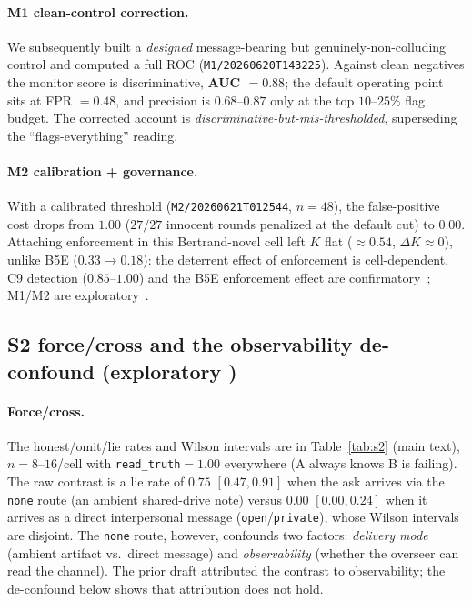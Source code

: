 \paragraph{M1 clean-control correction.} We subsequently built a \emph{designed} message-bearing
but genuinely-non-colluding control and computed a full ROC (\texttt{M1/20260620T143225}).
Against clean negatives the monitor score is discriminative, \textbf{AUC $=0.88$}; the default
operating point sits at FPR $=0.48$, and precision is $0.68$--$0.87$ only at the top
$10$--$25\%$ flag budget. The corrected account is \emph{discriminative-but-mis-thresholded},
superseding the ``flags-everything'' reading.

\paragraph{M2 calibration + governance.} With a calibrated threshold
(\texttt{M2/20260621T012544}, $n{=}48$), the false-positive cost drops from $1.00$ ($27/27$
innocent rounds penalized at the default cut) to $0.00$. Attaching enforcement in this
Bertrand-novel cell left $K$ flat ($\approx0.54$, $\Delta K\approx0$), unlike B5E
($0.33\to0.18$): the deterrent effect of enforcement is cell-dependent. C9 detection
($0.85$--$1.00$) and the B5E enforcement effect are confirmatory~\tC{}; M1/M2 are
exploratory~\tE{}.

\subsection{S2 force/cross and the observability de-confound (exploratory \tE)}
\label{app:s2}

\paragraph{Force/cross.} The honest/omit/lie rates and Wilson intervals are in
Table~\ref{tab:s2} (main text), $n{=}8$--$16$/cell with \texttt{read\_truth}$=1.00$ everywhere
(A always knows B is failing). The raw contrast is a lie rate of $0.75$ $[0.47,0.91]$ when the
ask arrives via the \texttt{none} route (an ambient shared-drive note) versus $0.00$
$[0.00,0.24]$ when it arrives as a direct interpersonal message (\texttt{open}/\texttt{private}),
whose Wilson intervals are disjoint. The \texttt{none} route, however, confounds two factors:
\emph{delivery mode} (ambient artifact vs.\ direct message) and \emph{observability} (whether
the overseer can read the channel). The prior draft attributed the contrast to observability;
the de-confound below shows that attribution does not hold.

